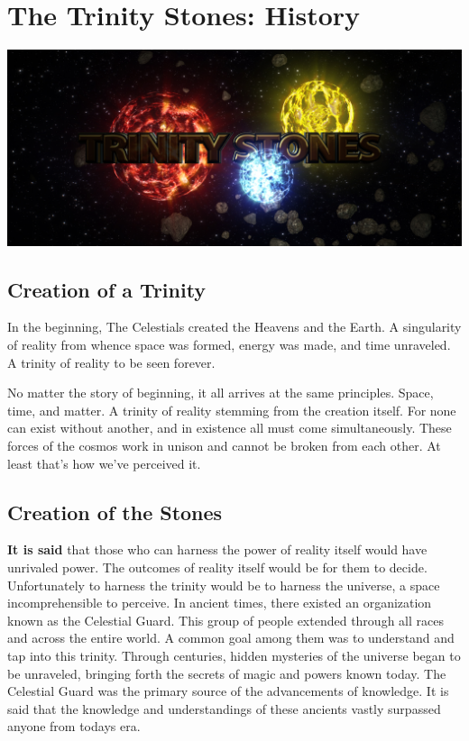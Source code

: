 \chapter{The Trinity Stones: History}

\begin{center}
	\includegraphics[width=\linewidth]{img/TS.jpg}
\end{center}


\section{Creation of a Trinity}

\begin{quotebox}
	In the beginning, The Celestials created the Heavens and the Earth. A singularity of reality from whence space was formed, energy was made, and time unraveled. A trinity of reality to be seen forever.
\end{quotebox}

No matter the story of beginning, it all arrives at the same principles. Space, time, and matter. A trinity of reality stemming from the creation itself. For none can exist without another, and in existence all must come simultaneously. These forces of the cosmos work in unison and cannot be broken from each other. At least that's how we've perceived it.

\section{Creation of the Stones}

\textbf{It is said} that those who can harness the power of reality itself would have unrivaled power. The outcomes of reality itself would be for them to decide. Unfortunately to harness the trinity would be to harness the universe, a space incomprehensible to perceive. In ancient times, there existed an organization known as the Celestial Guard. This group of people extended through all races and across the entire world. A common goal among them was to understand and tap into this trinity. Through centuries, hidden mysteries of the universe began to be unraveled, bringing forth the secrets of magic and powers known today. The Celestial Guard was the primary source of the advancements of knowledge. It is said that the knowledge and understandings of these ancients vastly surpassed anyone from todays era. 

